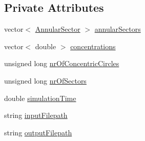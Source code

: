 \subsection*{\-Private \-Attributes}
\begin{DoxyCompactItemize}
\item 
vector$<$ \hyperlink{classmultiscale_1_1video_1_1AnnularSector}{\-Annular\-Sector} $>$ \hyperlink{classmultiscale_1_1video_1_1CartesianToPolarConverter_a3f8004ac5f8bae93c7a5e09bc37ba0ac}{annular\-Sectors}
\item 
vector$<$ double $>$ \hyperlink{classmultiscale_1_1video_1_1CartesianToPolarConverter_a7356e201623f518132d75b7bc48407d3}{concentrations}
\item 
unsigned long \hyperlink{classmultiscale_1_1video_1_1CartesianToPolarConverter_ab7c8564deaa38c57a251ba9592903238}{nr\-Of\-Concentric\-Circles}
\item 
unsigned long \hyperlink{classmultiscale_1_1video_1_1CartesianToPolarConverter_a62a2f5abe655f440e7c41fe834f828d0}{nr\-Of\-Sectors}
\item 
double \hyperlink{classmultiscale_1_1video_1_1CartesianToPolarConverter_a78003dc9053d89f56c03408f7f8fedda}{simulation\-Time}
\item 
string \hyperlink{classmultiscale_1_1video_1_1CartesianToPolarConverter_aa15eca9e8d3da0eb8ff1b6583e392f05}{input\-Filepath}
\item 
string \hyperlink{classmultiscale_1_1video_1_1CartesianToPolarConverter_a024d95ab3b9de6ed6fd1d951c5575e65}{output\-Filepath}
\end{DoxyCompactItemize}
